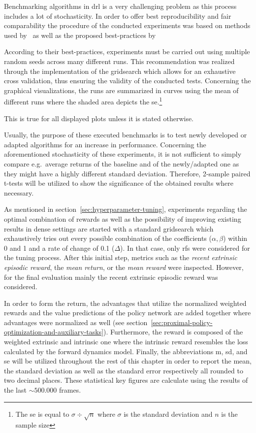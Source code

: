 \documentclass[draft,final]{vutinfth} %
\begin{document}
    Benchmarking algorithms in \gls{drl} is a very challenging problem as this process includes a lot of stochasticity.
    In order to offer best reproducibility and fair comparability the procedure of the conducted experiments was based on methods used by~\cite{burda_large-scale_2018-1} as well as the proposed best-practices by \citeauthor{francois-lavet_introduction_2018}

    According to their best-practices, experiments must be carried out using multiple random seeds across many different runs.
    This recommendation was realized through the implementation of the gridsearch which allows for an exhaustive cross validation, thus ensuring the validity of the conducted tests.
    Concerning the graphical visualizations, the runs are summarized in curves using the mean of different runs where the shaded area depicts the \gls{se}.\footnote{The \gls{se} is equal to $\sigma \div \sqrt{n}$ where $\sigma$ is the standard deviation and $n$ is the sample size}

    This is true for all displayed plots unless it is stated otherwise.

    Usually, the purpose of these executed benchmarks is to test newly developed or adapted algorithms for an increase in performance.
    Concerning the aforementioned stochasticity of these experiments, it is not sufficient to simply compare e.g.\ average returns of the baseline and of the newly/adapted one as they might have a highly different standard deviation.
    Therefore, 2-sample paired t-tests will be utilized to show the significance of the obtained results where necessary.

    As mentioned in section~\ref{sec:hyperparameter-tuning}, experiments regarding the optimal combination of rewards as well as the possibility of improving existing results in dense settings are started with a standard gridsearch which exhaustively tries out every possible combination of the coefficients ($\alpha,\beta$) within 0 and 1 and a rate of change of 0.1 ($\Delta$).
    In that case, only \glspl{rf} were considered for the tuning process.
    After this initial step, metrics such as the \textit{recent extrinsic episodic reward}, the \textit{mean return}, or the \textit{mean reward} were inspected.
    However, for the final evaluation mainly the recent extrinsic episodic reward was considered.

    In order to form the return, the advantages that utilize the normalized weighted rewards and the value predictions of the policy network are added together where advantages were normalized as well (see section~\ref{sec:proximal-policy-optimization-and-auxiliary-tasks}).
    Furthermore, the reward is composed of the weighted extrinsic and intrinsic one where the intrinsic reward resembles the loss calculated by the forward dynamics model.
    Finally, the abbreviations \acrshort{m}, \acrshort{sd}, and \acrshort{se} will be utilized throughout the rest of this chapter in order to report the mean, the standard deviation as well as the standard error respectively all rounded to two decimal places.
    These statistical key figures are calculate using the results of the last $\sim500.000$ frames.
\end{document}
